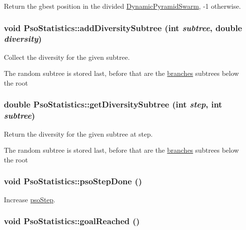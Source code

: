 Return the gbest position in the divided \hyperlink{classDynamicPyramidSwarm}{DynamicPyramidSwarm}, -1 otherwise. 

\hypertarget{classPsoStatistics_7716ae0c84ec1c5a46410eb3ca8ba61f}{
\subsubsection{\setlength{\rightskip}{0pt plus 5cm}void PsoStatistics::addDiversitySubtree (int {\em subtree}, \/  double {\em diversity})}}
\label{classPsoStatistics_7716ae0c84ec1c5a46410eb3ca8ba61f}


Collect the diversity for the given subtree. 

The random subtree is stored last, before that are the \hyperlink{runpso_8cpp_862f1f1b7a79e1acd3a882c444a7fa62}{branches} subtrees below the root \hypertarget{classPsoStatistics_f67cf355e48366ad9dcd5c0a08f42d87}{
\subsubsection{\setlength{\rightskip}{0pt plus 5cm}double PsoStatistics::getDiversitySubtree (int {\em step}, \/  int {\em subtree})}}
\label{classPsoStatistics_f67cf355e48366ad9dcd5c0a08f42d87}


Return the diversity for the given subtree at step. 

The random subtree is stored last, before that are the \hyperlink{runpso_8cpp_862f1f1b7a79e1acd3a882c444a7fa62}{branches} subtrees below the root \hypertarget{classPsoStatistics_6eeabeed3d61750743e14c6edadffd6d}{
\subsubsection{\setlength{\rightskip}{0pt plus 5cm}void PsoStatistics::psoStepDone ()}}
\label{classPsoStatistics_6eeabeed3d61750743e14c6edadffd6d}


Increase \hyperlink{classPsoStatistics_6f6a1e27328b88d53224fa45138bb1ef}{psoStep}. 

\hypertarget{classPsoStatistics_5a4bd7d3c0f620a4441263aa366c7ef9}{
\subsubsection{\setlength{\rightskip}{0pt plus 5cm}void PsoStatistics::goalReached ()}}
\label{classPsoStatistics_5a4bd7d3c0f620a4441263aa366c7ef9}



